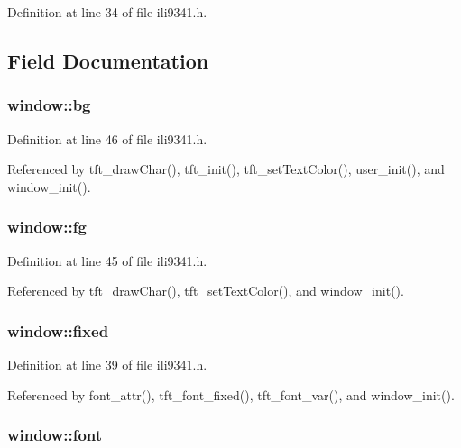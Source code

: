 Definition at line 34 of file ili9341.\-h.



\subsection{Field Documentation}
\hypertarget{structwindow_affcf5d29153103c2537542f5a4f8ba87}{
\subsubsection[{bg}]{ window\-::bg}}\label{structwindow_affcf5d29153103c2537542f5a4f8ba87}


Definition at line 46 of file ili9341.\-h.



Referenced by tft\-\_\-draw\-Char(), tft\-\_\-init(), tft\-\_\-set\-Text\-Color(), user\-\_\-init(), and window\-\_\-init().

\hypertarget{structwindow_ac8739cdb3c50efcc1deaa5ab955a5e62}{
\subsubsection[{fg}]{ window\-::fg}}\label{structwindow_ac8739cdb3c50efcc1deaa5ab955a5e62}


Definition at line 45 of file ili9341.\-h.



Referenced by tft\-\_\-draw\-Char(), tft\-\_\-set\-Text\-Color(), and window\-\_\-init().

\hypertarget{structwindow_a39a810713bcc5f9054a4a8a52d9efcc7}{
\subsubsection[{fixed}]{ window\-::fixed}}\label{structwindow_a39a810713bcc5f9054a4a8a52d9efcc7}


Definition at line 39 of file ili9341.\-h.



Referenced by font\-\_\-attr(), tft\-\_\-font\-\_\-fixed(), tft\-\_\-font\-\_\-var(), and window\-\_\-init().

\hypertarget{structwindow_acee24e56db43557a46cbb5ca3fe35021}{
\subsubsection[{font}]{ window\-::font}}\label{structwindow_acee24e56db43557a46cbb5ca3fe35021}


